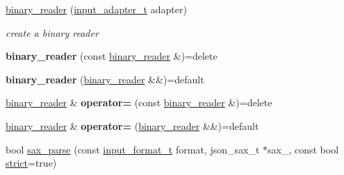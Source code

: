 \begin{DoxyCompactItemize}
\item 
\mbox{\hyperlink{classnlohmann_1_1detail_1_1binary__reader_aed84f0302eb232d3b69f7653bef2337a}{binary\+\_\+reader}} (\mbox{\hyperlink{namespacenlohmann_1_1detail_ae132f8cd5bb24c5e9b40ad0eafedf1c2}{input\+\_\+adapter\+\_\+t}} adapter)
\begin{DoxyCompactList}\small\item\em create a binary reader \end{DoxyCompactList}\item 
\mbox{\label{classnlohmann_1_1detail_1_1binary__reader_aacbece7dfa1698dfb3f22c90922d7244}} 
{\bfseries binary\+\_\+reader} (const \mbox{\hyperlink{classnlohmann_1_1detail_1_1binary__reader}{binary\+\_\+reader}} \&)=delete
\item 
\mbox{\label{classnlohmann_1_1detail_1_1binary__reader_a254d91b10c2f4579634b6f70ffc1ef16}} 
{\bfseries binary\+\_\+reader} (\mbox{\hyperlink{classnlohmann_1_1detail_1_1binary__reader}{binary\+\_\+reader}} \&\&)=default
\item 
\mbox{\label{classnlohmann_1_1detail_1_1binary__reader_a87826b833ee7fec146c97233bb0f6ab8}} 
\mbox{\hyperlink{classnlohmann_1_1detail_1_1binary__reader}{binary\+\_\+reader}} \& {\bfseries operator=} (const \mbox{\hyperlink{classnlohmann_1_1detail_1_1binary__reader}{binary\+\_\+reader}} \&)=delete
\item 
\mbox{\label{classnlohmann_1_1detail_1_1binary__reader_a7ba0e555da725a2efa17048e67aec9a9}} 
\mbox{\hyperlink{classnlohmann_1_1detail_1_1binary__reader}{binary\+\_\+reader}} \& {\bfseries operator=} (\mbox{\hyperlink{classnlohmann_1_1detail_1_1binary__reader}{binary\+\_\+reader}} \&\&)=default
\item 
bool \mbox{\hyperlink{classnlohmann_1_1detail_1_1binary__reader_ab94a54d6e595c2620b07589cf4116256}{sax\+\_\+parse}} (const \mbox{\hyperlink{namespacenlohmann_1_1detail_aa554fc6a11519e4f347deb25a9f0db40}{input\+\_\+format\+\_\+t}} format, json\+\_\+sax\+\_\+t $\ast$sax\+\_\+, const bool \mbox{\hyperlink{namespacenlohmann_1_1detail_a5a76b60b26dc8c47256a996d18d967dfa2133fd717402a7966ee88d06f9e0b792}{strict}}=true)
\end{DoxyCompactItemize}
